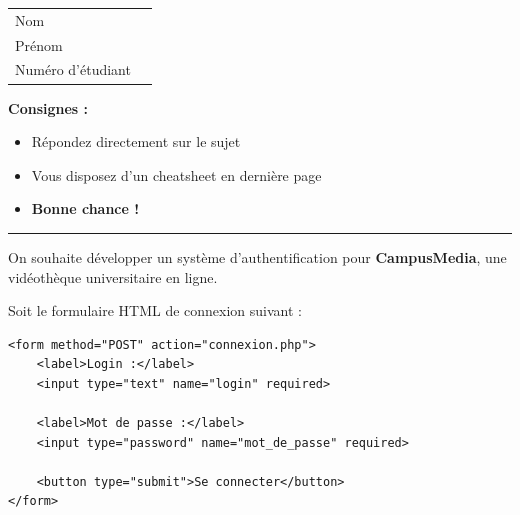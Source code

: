 \documentclass[11pt,a4paper]{article}
\begin{document}
\vspace{10pt}

\noindent
\begin{tabular}{ll}
  Nom              & \dotfill \\[8pt]
  Prénom           & \dotfill \\[8pt]
  Numéro d'étudiant & \dotfill \\
\end{tabular}

\vspace{10pt}

\noindent\textbf{Consignes :}
\begin{itemize}[leftmargin=1.5em, itemsep=1pt, topsep=2pt]
  \item Répondez directement sur le sujet
  \item Vous disposez d'un cheatsheet en dernière page
  \item \textbf{Bonne chance !}
\end{itemize}

\vspace{6pt}
\noindent\rule{\linewidth}{0.4pt}

\begin{mdframed}[style=exstyle, frametitle={Exercice 1 \quad Sessions \& Cookies \hfill (5 pts)}]
On souhaite développer un système d'authentification pour \textbf{CampusMedia}, une vidéothèque universitaire en ligne.

Soit le formulaire HTML de connexion suivant :

\begin{lstlisting}[language=HTML2]
<form method="POST" action="connexion.php">
    <label>Login :</label>
    <input type="text" name="login" required>

    <label>Mot de passe :</label>
    <input type="password" name="mot_de_passe" required>

    <button type="submit">Se connecter</button>
</form>
\end{lstlisting}
\end{mdframed}

\bigskip
\end{document}
